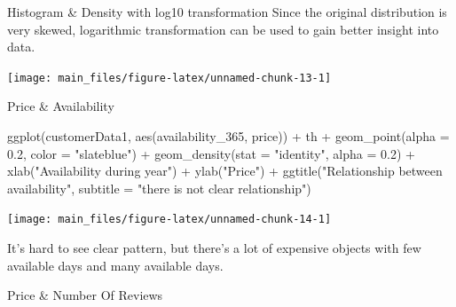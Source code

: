 Histogram \& Density with log10 transformation Since the original
distribution is very skewed, logarithmic transformation can be used to
gain better insight into data.

\begin{Schunk}


\begin{center}\texttt{[image: main\_files/figure-latex/unnamed-chunk-13-1]} \end{center}

\end{Schunk}

Price \& Availability

\begin{Schunk}
\begin{Sinput}
ggplot(customerData1, aes(availability_365, price)) +
  th +
  geom_point(alpha = 0.2, color = "slateblue") +
  geom_density(stat = "identity", alpha = 0.2) +
  xlab("Availability during year") +
  ylab("Price") +
  ggtitle("Relationship between availability",
          subtitle = "there is not clear relationship") 
\end{Sinput}


\begin{center}\texttt{[image: main\_files/figure-latex/unnamed-chunk-14-1]} \end{center}

\end{Schunk}

It's hard to see clear pattern, but there's a lot of expensive objects
with few available days and many available days.

Price \& Number Of Reviews

